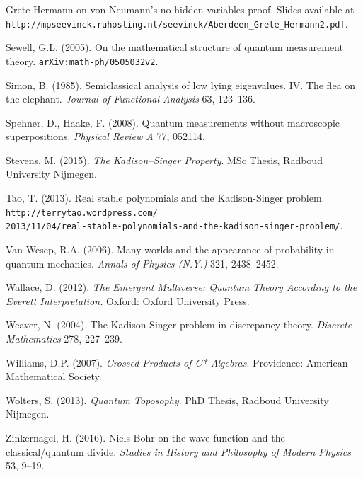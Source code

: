 \documentclass[12pt]{article}
\begin{document}
\begin{footnotesize}
\begin{trivlist}
Grete Hermann on von Neumann's no-hidden-variables proof. Slides available at \hfil\break
\verb#http://mpseevinck.ruhosting.nl/seevinck/Aberdeen_Grete_Hermann2.pdf#.
\item   Sewell, G.L. (2005).  On the mathematical structure of quantum measurement theory.
\texttt{arXiv:math-ph/0505032v2}.
\item   Simon, B. (1985).
Semiclassical analysis of low lying eigenvalues. IV. The flea on the elephant.  \emph{Journal of Functional Analysis}
 63, 123--136.
\item  Spehner, D., Haake,  F. (2008). Quantum measurements without macroscopic superpositions.
\emph{Physical Review A}  77, 052114.
 \item Stevens, M. (2015). \emph{The Kadison--Singer Property}. MSc Thesis, Radboud University Nijmegen. 
 \item Tao, T. (2013). Real stable polynomials and the Kadison-Singer problem. \hfil\break
\texttt{http://terrytao.wordpress.com/}\\ \texttt{2013/11/04/real-stable-polynomials-and-the-kadison-singer-problem/}.
\item  Van Wesep, R.A. (2006).  Many worlds and the appearance of probability in quantum mechanics.
 \emph{Annals of Physics (N.Y.)} 321, 2438--2452. 
\item Wallace, D. (2012). \emph{The Emergent Multiverse: Quantum Theory According to the Everett Interpretation.}
Oxford: Oxford University Press. 
\item  Weaver, N. (2004). The Kadison-Singer problem in discrepancy theory. \emph{Discrete Mathematics} 278, 227--239.
\item Williams, D.P. (2007). \emph{Crossed Products of C*-Algebras}. Providence: American Mathematical Society. 
\item  Wolters, S. (2013). \emph{Quantum Toposophy}. PhD Thesis, Radboud University Nijmegen. 
\item Zinkernagel, H. (2016). Niels Bohr on the wave function and the classical/quantum divide.
\emph{Studies in History and Philosophy of Modern Physics}  53,  9--19.
\end{trivlist}
\end{footnotesize}
\end{document}
